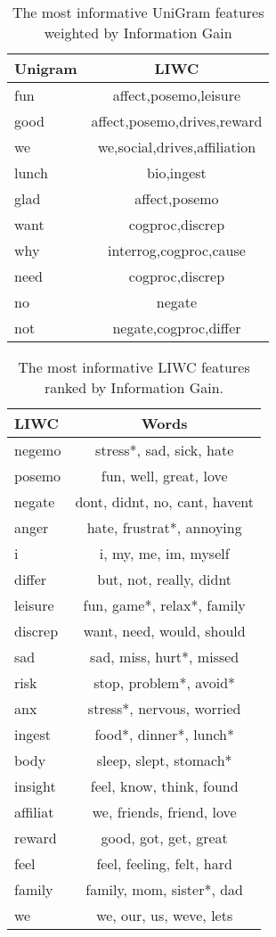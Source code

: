 \documentclass[11pt,letterpaper]{article}
\begin{document}
 \begin{table}[h!t]
 \small
 \centering
 \begin{tabularx}{2.55in}{p{0.75in}|c}
 \toprule
 \bf Unigram & \bf LIWC \\
 \midrule
 fun& affect,posemo,leisure \\
 good  & affect,posemo,drives,reward \\
 we &  we,social,drives,affiliation \\
 lunch &  bio,ingest \\
 glad &  affect,posemo  \\
 want & cogproc,discrep \\
 why & interrog,cogproc,cause \\
 need & cogproc,discrep \\
 no & negate \\
 not & negate,cogproc,differ \\
 \bottomrule
 \end{tabularx}
 \caption{\label{tab:unigram} The most informative UniGram features weighted by Information Gain} 
 \end{table}

\begin{table}[h!]
 \small
\centering
 \begin{tabularx}{2.55in}{p{0.75in}|c}
 \toprule
 \bf LIWC & \bf Words \\
 \midrule
 negemo & stress*, sad, sick, hate  \\
 posemo & fun, well, great, love \\
 negate & dont, didnt, no, cant, havent\\
 anger& hate, frustrat*, annoying \\
 i & i, my, me, im, myself \\
 differ& but, not, really, didnt \\
 leisure & fun, game*, relax*, family \\
 discrep & want, need, would, should \\
 sad & sad, miss, hurt*, missed \\
 risk & stop, problem*, avoid* \\
 anx & stress*, nervous, worried \\
 ingest & food*, dinner*, lunch* \\
 body & sleep, slept, stomach* \\
 insight & feel, know, think, found \\
 affiliat & we, friends, friend, love \\
 reward & good, got, get, great \\
 feel & feel, feeling, felt, hard \\
 family & family, mom, sister*, dad \\
 we & we, our, us, weve, lets\\
 \bottomrule
 \end{tabularx}
 \caption{\label{tab:liwc} The most informative LIWC features ranked by Information Gain.}
 \end{table}
\end{document}
